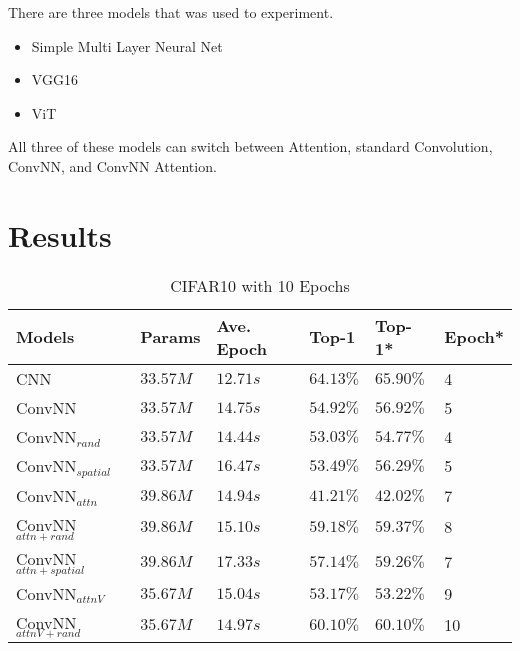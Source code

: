 \documentclass{article}
\begin{document}
There are three models that was used to experiment. 

\begin{itemize}
    \item Simple Multi Layer Neural Net
    \item VGG16 
    \item ViT 
\end{itemize}

All three of these models can switch between Attention, standard Convolution, ConvNN, and ConvNN Attention. 





\section{Results}
\begin{table}[h]
  \centering
  \begin{threeparttable}
    \caption{CIFAR10 with 10 Epochs}\label{tab1}
    \begin{tabular}{@{}l|l|l|l|l|l@{}}
      \toprule
      Models & Params & Ave. Epoch & Top-1 & Top-1* & Epoch*\\ 
      \midrule
      CNN                                   & \(33.57M\) & \(12.71s\) & \(\bm{64.13\%}\) & \(\bm{65.90\%}\) & 4 \\
      
      \midrule
      ConvNN                                & \(33.57M\) & \(14.75s\) & \(54.92\%\)  & \(56.92\%\) & 5 \\
      ConvNN\(_{rand}\)                     & \(33.57M\) & \(14.44s\) & \(53.03\%\)  & \(54.77\%\) & 4 \\
      ConvNN\(_{spatial}\)                  & \(33.57M\) & \(16.47s\) & \(53.49\%\)  & \(56.29\%\) & 5 \\
      
      \midrule
      ConvNN\(_{attn}\)                     & \(39.86M\) & \(14.94s\) & \(41.21\%\)  & \(42.02\%\) & 7 \\
      ConvNN\(_{attn+rand}\)                & \(39.86M\) & \(15.10s\) & \(59.18\%\)  & \(59.37\%\) & 8 \\
      ConvNN\(_{attn+spatial}\)             & \(39.86M\) & \(17.33s\) & \(57.14\%\)  & \(59.26\%\) & 7 \\

      ConvNN\(_{attnV}\)                    & \(35.67M\) & \(15.04s\) & \(53.17\%\)  & \(53.22\%\) & 9 \\
      ConvNN\(_{attnV+rand}\)               & \(35.67M\) & \(14.97s\) & \(60.10\%\)  & \(60.10\%\) & 10 \\
      

\end{tabular}
\end{threeparttable}
\end{table}
\end{document}
